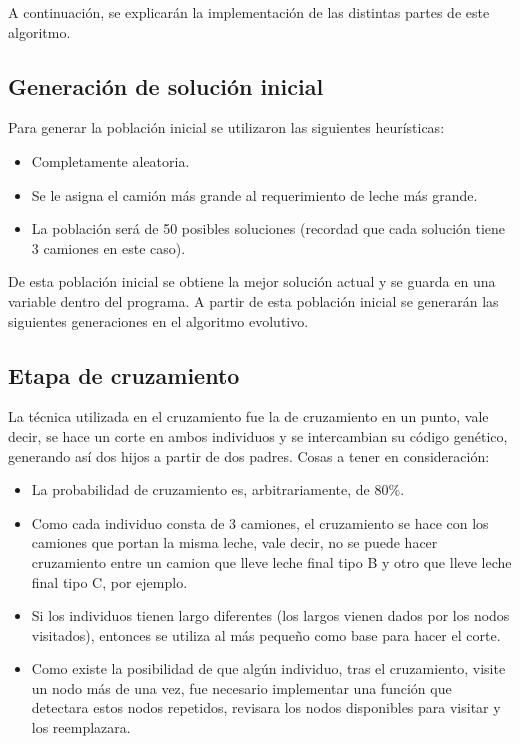 \documentclass[letter, 10pt]{article}
\begin{document}
A continuación, se explicarán la implementación de las distintas partes de este algoritmo.

\subsection{Generación de solución inicial}

Para generar la población inicial se utilizaron las siguientes heurísticas:
\begin{itemize}
    \item Completamente aleatoria.
    \item Se le asigna el camión más grande al requerimiento de leche más grande.
    \item La población será de 50 posibles soluciones (recordad que cada solución tiene 3 camiones en este caso).
\end{itemize}

De esta población inicial se obtiene la mejor solución actual y se guarda en una variable dentro del programa. A partir de esta población inicial se generarán las siguientes generaciones en el algoritmo evolutivo.

\subsection{Etapa de cruzamiento}

La técnica utilizada en el cruzamiento fue la de cruzamiento en un punto, vale decir, se hace un corte en ambos individuos y se intercambian su código genético, generando así dos hijos a partir de dos padres. Cosas a tener en consideración:

\begin{itemize}
    \item La probabilidad de cruzamiento es, arbitrariamente, de 80\%.
    \item Como cada individuo consta de 3 camiones, el cruzamiento se hace con los camiones que portan la misma leche, vale decir, no se puede hacer cruzamiento entre un camion que lleve leche final tipo B y otro que lleve leche final tipo C, por ejemplo.
    \item Si los individuos tienen largo diferentes (los largos vienen dados por los nodos visitados), entonces se utiliza al más pequeño como base para hacer el corte.
    \item Como existe la posibilidad de que algún individuo, tras el cruzamiento, visite un nodo más de una vez, fue necesario implementar una función que detectara estos nodos repetidos, revisara los nodos disponibles para visitar y los reemplazara.
\end{itemize}
\end{document}
